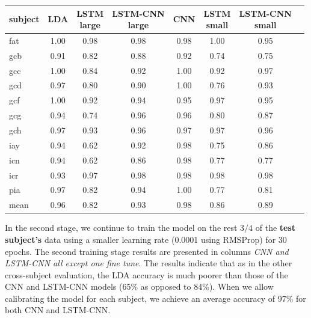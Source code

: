 \documentclass[
12pt, %
english, %
doublespacing, %
headsepline, %
]{MastersDoctoralThesis} %
\begin{document}
\begin{table}
	\centering
	\label{table:AccuracyPerSubject}	
	\begin{tabular}{l|ccccccc}
		\toprule
		{subject} &   LDA &\makecell{LSTM\\large}&  \makecell{LSTM-CNN\\large}&   CNN &\makecell{LSTM\\ small}&\makecell{LSTM-CNN\\small}\\
		\midrule
		fat     &  1.00 &  0.98 &      0.98 &  0.98 &        1.00 &            0.95 \\
		gcb     &  0.91 &  0.82 &      0.88 &  0.92 &        0.74 &            0.75 \\
		gcc     &  1.00 &  0.84 &      0.92 &  1.00 &        0.92 &            0.97 \\
		gcd     &  0.97 &  0.80 &      0.90 &  1.00 &        0.76 &            0.93 \\
		gcf     &  1.00 &  0.92 &      0.94 &  0.95 &        0.97 &            0.95 \\
		gcg     &  0.94 &  0.74 &      0.96 &  0.96 &        0.80 &            0.87 \\
		gch     &  0.97 &  0.93 &      0.96 &  0.97 &        0.97 &            0.96 \\
		iay     &  0.94 &  0.62 &      0.92 &  0.98 &        0.75 &            0.86 \\
		icn     &  0.94 &  0.62 &      0.86 &  0.98 &        0.77 &            0.77 \\
		icr     &  0.93 &  0.97 &      0.98 &  0.98 &        0.98 &            0.98 \\
		pia     &  0.97 &  0.82 &      0.94 &  1.00 &        0.77 &            0.81 \\
		mean    &  0.96 &  0.82 &      0.93 &  0.98 &        0.86 &            0.89 \\
		\bottomrule
	\end{tabular}
	
\end{table}

In the second stage, we continue to train the model on the rest $3/4$ of the \textbf{test subject's} data using a smaller learning rate (0.0001 using RMSProp) for 30 epochs. The second training stage results are presented in columns \textit{CNN and LSTM-CNN all except one fine tune}. The results indicate that as in the other cross-subject evaluation, the LDA accuracy is much poorer than those of the CNN and LSTM-CNN models (65\% as opposed to 84\%). When we allow calibrating the model for each subject, we achieve an average accuracy of 97\% for both CNN and LSTM-CNN.
\end{document}
